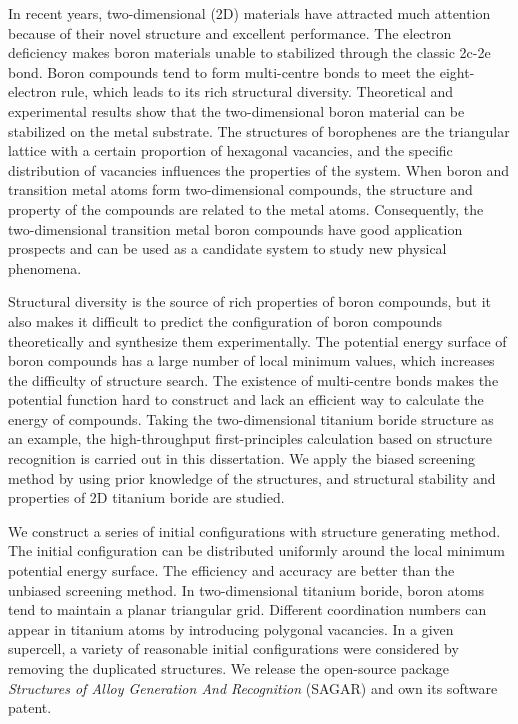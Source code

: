 \documentclass[phd,nobackinfo]{scutthesis}
\begin{document}
\begin{englishabstract}
    In recent years, two-dimensional (2D) materials have attracted much attention because of their novel structure and excellent performance. The electron deficiency makes boron materials unable to stabilized through the classic 2c-2e bond. Boron compounds tend to form multi-centre bonds to meet the eight-electron rule, which leads to its rich structural diversity. Theoretical and experimental results show that the two-dimensional boron material can be stabilized on the metal substrate. The structures of borophenes are the triangular lattice with a certain proportion of hexagonal vacancies, and the specific distribution of vacancies influences the properties of the system. When boron and transition metal atoms form two-dimensional compounds, the structure and property of the compounds are related to the metal atoms. Consequently, the two-dimensional transition metal boron compounds have good application prospects and can be used as a candidate system to study new physical phenomena.

    Structural diversity is the source of rich properties of boron compounds, but it also makes it difficult to predict the configuration of boron compounds theoretically and synthesize them experimentally. The potential energy surface of boron compounds has a large number of local minimum values, which increases the difficulty of structure search. The existence of multi-centre bonds makes the potential function hard to construct and lack an efficient way to calculate the energy of compounds. Taking the two-dimensional titanium boride structure as an example, the high-throughput first-principles calculation based on structure recognition is carried out in this dissertation. We apply the biased screening method by using prior knowledge of the structures, and structural stability and properties of 2D titanium boride are studied.

    We construct a series of initial configurations with structure generating method. 
    The initial configuration can be distributed uniformly around the local minimum potential energy surface. The efficiency and accuracy are better than the unbiased screening method. In two-dimensional titanium boride, boron atoms tend to maintain a planar triangular grid. Different coordination numbers can appear in titanium atoms by introducing polygonal vacancies. In a given supercell, a variety of reasonable initial configurations were considered by removing the duplicated structures. We release the open-source package \textit{Structures of Alloy Generation And Recognition} (SAGAR) and own its software patent.


\end{englishabstract}
\end{document}
